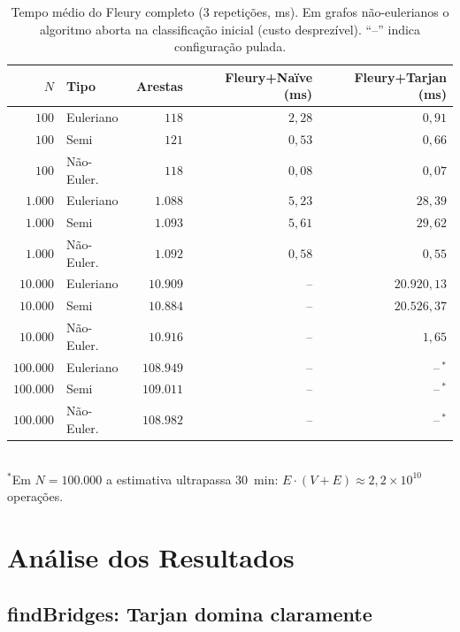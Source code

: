\documentclass[12pt]{article}
\begin{document}
\begin{table}[H]
\centering
\caption{Tempo médio do Fleury completo (3 repetições, ms). Em grafos
não-eulerianos o algoritmo aborta na classificação inicial (custo
desprezível). ``--'' indica configuração pulada.}
\label{tab:fleury}
\begin{tabular}{rlrrr}
\toprule
$N$ & Tipo & Arestas & Fleury+Naïve (ms) & Fleury+Tarjan (ms) \\
\midrule
$100$       & Euleriano     & $118$     & $2{,}28$         & $0{,}91$ \\
$100$       & Semi          & $121$     & $0{,}53$         & $0{,}66$ \\
$100$       & Não-Euler.    & $118$     & $0{,}08$         & $0{,}07$ \\
\midrule
$1.000$     & Euleriano     & $1.088$   & $5{,}23$         & $28{,}39$ \\
$1.000$     & Semi          & $1.093$   & $5{,}61$         & $29{,}62$ \\
$1.000$     & Não-Euler.    & $1.092$   & $0{,}58$         & $0{,}55$ \\
\midrule
$10.000$    & Euleriano     & $10.909$  & --               & $20.920{,}13$ \\
$10.000$    & Semi          & $10.884$  & --               & $20.526{,}37$ \\
$10.000$    & Não-Euler.    & $10.916$  & --               & $1{,}65$ \\
\midrule
$100.000$   & Euleriano     & $108.949$ & --               & --\,$^*$ \\
$100.000$   & Semi          & $109.011$ & --               & --\,$^*$ \\
$100.000$   & Não-Euler.    & $108.982$ & --               & --\,$^*$ \\
\bottomrule
\end{tabular}\\[0.4em]
{\small $^*$Em $N=100.000$ a estimativa ultrapassa 30~min:
$E \cdot (V{+}E) \approx 2{,}2 \times 10^{10}$ operações.}
\end{table}

\section{Análise dos Resultados}
\label{sec:analise}

\subsection{findBridges: Tarjan domina claramente}
\end{document}
